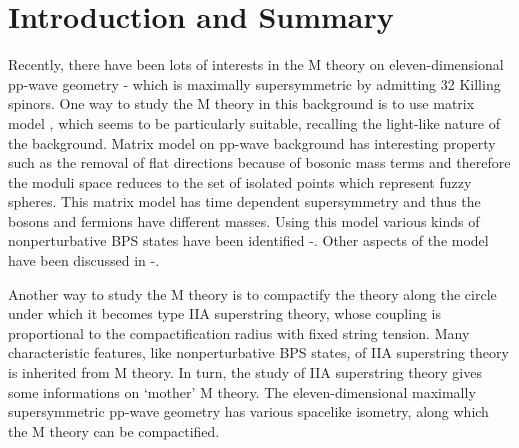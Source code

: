 \documentclass[a4paper,12pt]{article}
\begin{document}
\section{Introduction and Summary}
Recently, there have been lots of interests in the M theory on 
eleven-dimensional 
pp-wave geometry \cite{kow194}-\cite{bla081} which is maximally supersymmetric 
by admitting 32 Killing
spinors. One way to study the M theory in this background is to use matrix
model \cite{ber021}, which seems to be particularly suitable, 
recalling the light-like nature 
of the background. Matrix model on pp-wave background
\cite{ber021,das185} has interesting property such as the removal of
flat directions because of bosonic mass terms and therefore the moduli
space reduces to the set of isolated points which represent fuzzy spheres.
This matrix model has time dependent supersymmetry and thus  the bosons and
fermions have different masses. 
Using this model various kinds of nonperturbative BPS 
states have been identified \cite{das185}-\cite{par161}. Other aspects of 
the model have been discussed in \cite{kim061}-\cite{mic204}. 

Another way to study the M theory is to compactify the theory along
the circle under which it becomes type IIA superstring theory, whose
coupling is proportional to the compactification radius with fixed
string tension.  Many characteristic features, like nonperturbative
BPS states, of IIA superstring theory is inherited from M theory. In
turn, the study of IIA superstring theory gives some informations on
`mother' M theory.  The eleven-dimensional maximally supersymmetric
pp-wave geometry has various spacelike isometry, along which the M
theory can be compactified\cite{mic140}.
\end{document}
